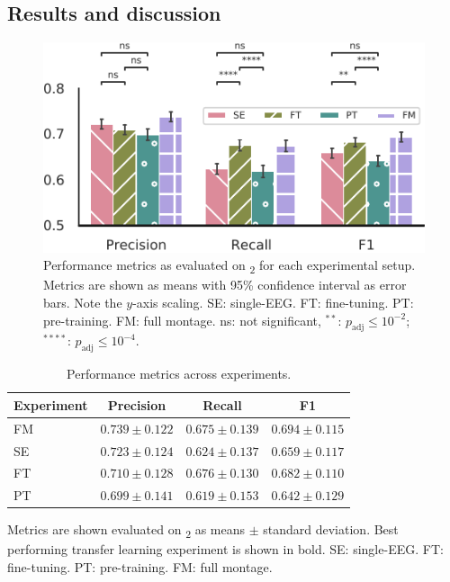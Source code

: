 \subsection{Results and discussion}
\begin{figure}[tb]
    \centering
    \includegraphics[width=\columnwidth]{figures/paper-v/paperv-figure01.pdf}
    \caption[MSED-TL performance on \test{}\textsubscript{2}]{Performance metrics as evaluated on \test{}\textsubscript{2} for each experimental setup. Metrics are shown as means with 95\% confidence interval as error bars. Note the $y$-axis scaling. SE: single-\ac{EEG}. FT: fine-tuning. PT: pre-training. FM: full montage. ns: not significant, $^{**}$: $p_{\mathrm{adj}} \leq 10^{-2}$; $^{****}$: $p_{\mathrm{adj}} \leq 10^{-4}$.}
    \label{fig:paperv-figure01}
\end{figure}

\begin{table}[tb]
    \centering
    \begin{threeparttable}
        \small
        \caption{Performance metrics across experiments.}
        \label{tab:paperv-results}
        \begin{tabular}{@{}lccc@{}}
        \toprule
        \textbf{Experiment} &        \textbf{Precision} &           \textbf{Recall} &               \textbf{F1} \\ \midrule
        FM &  $0.739 \pm 0.122$ &  $0.675 \pm 0.139$ &  $0.694 \pm 0.115$ \\
        SE &  $0.723 \pm 0.124$ &  $0.624 \pm 0.137$ &  $0.659 \pm 0.117$ \\ \midrule
        FT &  $\mathbf{0.710 \pm 0.128}$ &  $\mathbf{0.676 \pm 0.130}$ & $\mathbf{0.682 \pm 0.110}$ \\
        PT &  $0.699 \pm 0.141$ &  $0.619 \pm 0.153$ &  $0.642 \pm 0.129$ \\
        \bottomrule
        \end{tabular}
        \begin{tablenotes}
            \small
            \item Metrics are shown evaluated on \test{}\textsubscript{2} as means $\pm$ standard deviation. Best performing transfer learning experiment is shown in bold. SE: single-\ac{EEG}. FT: fine-tuning. PT: pre-training. FM: full montage.
        \end{tablenotes}
    \end{threeparttable}
\end{table}


